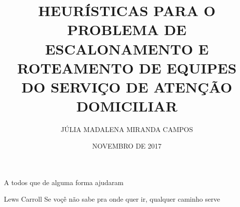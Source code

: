 \documentclass[qual, classic, a4paper]{ufbathesis}
\institute{INSTITUTO DE MATEM\'{A}TICA}
\title{HEURÍSTICAS PARA O PROBLEMA DE  ESCALONAMENTO E ROTEAMENTO DE EQUIPES DO SERVIÇO DE ATEN\c{C}\~AO DOMICILIAR}
\date{NOVEMBRO DE 2017}
\author{JÚLIA MADALENA MIRANDA CAMPOS}
\begin{document}


\frontpage

\frontmatter

\presentationpage






\acknowledgements
A todos que de alguma forma ajudaram

 \begin{epigraph}[]{Lews Carroll}
  Se vo\c{c}\^{e} n\~{a}o sabe pra onde quer ir, qualquer caminho serve
 \end{epigraph}






\listoffigures

\listoftables

\mainmatter
\linespread{4}
\end{document}
